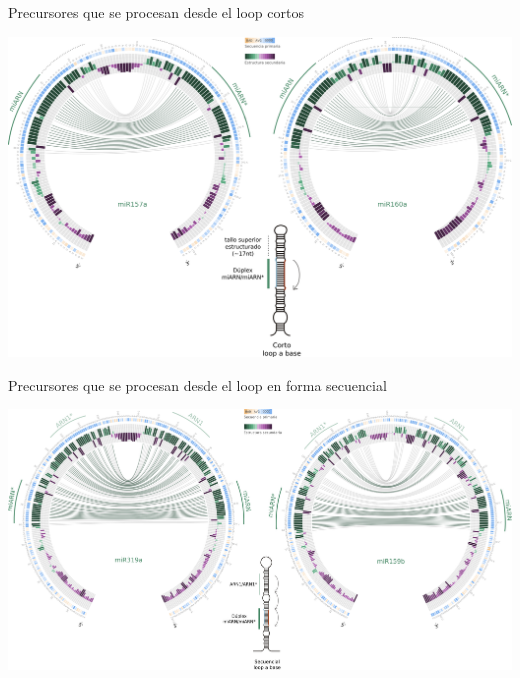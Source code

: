 \documentclass{beamer}
\begin{document}
\begin{frame}{Precursores que se procesan desde el loop cortos}
	\begin{center}
		\includegraphics[width=1\textwidth]{img/srLTB_circos_defensa.png}
	\end{center}
\end{frame}

\begin{frame}{Precursores que se procesan desde el loop en forma secuencial}
	\begin{center}
		\includegraphics[width=1\textwidth]{img/seqLTB_circos_defensa.png}
	\end{center}
\end{frame}
\end{document}
